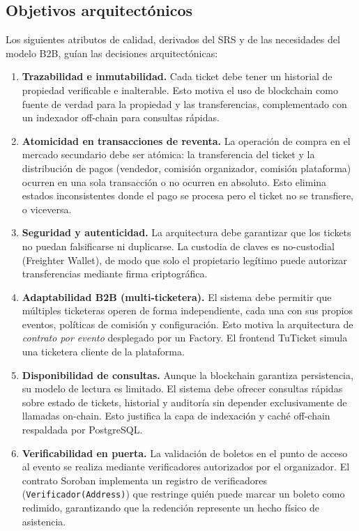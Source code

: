 \documentclass[12pt,oneside]{article}
\begin{document}
\subsection{Objetivos arquitectónicos}
\label{subsec:objetivos}

Los siguientes atributos de calidad, derivados del SRS y de las necesidades del modelo B2B, guían las decisiones arquitectónicas:

\begin{enumerate}
  \item \textbf{Trazabilidad e inmutabilidad.} Cada ticket debe tener un historial de propiedad verificable e inalterable. Esto motiva el uso de blockchain como fuente de verdad para la propiedad y las transferencias, complementado con un indexador off-chain para consultas rápidas.

  \item \textbf{Atomicidad en transacciones de reventa.} La operación de compra en el mercado secundario debe ser atómica: la transferencia del ticket y la distribución de pagos (vendedor, comisión organizador, comisión plataforma) ocurren en una sola transacción o no ocurren en absoluto. Esto elimina estados inconsistentes donde el pago se procesa pero el ticket no se transfiere, o viceversa.

  \item \textbf{Seguridad y autenticidad.} La arquitectura debe garantizar que los tickets no puedan falsificarse ni duplicarse. La custodia de claves es no-custodial (Freighter Wallet), de modo que solo el propietario legítimo puede autorizar transferencias mediante firma criptográfica.

  \item \textbf{Adaptabilidad B2B (multi-ticketera).} El sistema debe permitir que múltiples ticketeras operen de forma independiente, cada una con sus propios eventos, políticas de comisión y configuración. Esto motiva la arquitectura de \textit{contrato por evento} desplegado por un Factory. El frontend TuTicket simula una ticketera cliente de la plataforma.

  \item \textbf{Disponibilidad de consultas.} Aunque la blockchain garantiza persistencia, su modelo de lectura es limitado. El sistema debe ofrecer consultas rápidas sobre estado de tickets, historial y auditoría sin depender exclusivamente de llamadas on-chain. Esto justifica la capa de indexación y caché off-chain respaldada por PostgreSQL.

  \item \textbf{Verificabilidad en puerta.} La validación de boletos en el punto de acceso al evento se realiza mediante verificadores autorizados por el organizador. El contrato Soroban implementa un registro de verificadores (\texttt{Verificador(Address)}) que restringe quién puede marcar un boleto como redimido, garantizando que la redención represente un hecho físico de asistencia.
\end{enumerate}
\end{document}
